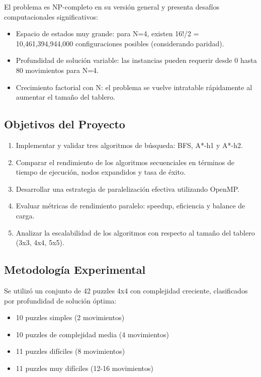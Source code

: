 \documentclass[12pt,a4paper]{article}
\begin{document}
El problema es NP-completo en su versión general y presenta desafíos computacionales significativos:
\begin{itemize}
    \item Espacio de estados muy grande: para N=4, existen 16!/2 = 10,461,394,944,000 configuraciones posibles (considerando paridad).
    \item Profundidad de solución variable: las instancias pueden requerir desde 0 hasta 80 movimientos para N=4.
    \item Crecimiento factorial con N: el problema se vuelve intratable rápidamente al aumentar el tamaño del tablero.
\end{itemize}

\subsection{Objetivos del Proyecto}

\begin{enumerate}
    \item Implementar y validar tres algoritmos de búsqueda: BFS, A*-h1 y A*-h2.
    \item Comparar el rendimiento de los algoritmos secuenciales en términos de tiempo de ejecución, nodos expandidos y tasa de éxito.
    \item Desarrollar una estrategia de paralelización efectiva utilizando OpenMP.
    \item Evaluar métricas de rendimiento paralelo: speedup, eficiencia y balance de carga.
    \item Analizar la escalabilidad de los algoritmos con respecto al tamaño del tablero (3x3, 4x4, 5x5).
\end{enumerate}

\subsection{Metodología Experimental}

Se utilizó un conjunto de 42 puzzles 4x4 con complejidad creciente, clasificados por profundidad de solución óptima:
\begin{itemize}
    \item 10 puzzles simples (2 movimientos)
    \item 10 puzzles de complejidad media (4 movimientos)
    \item 11 puzzles difíciles (8 movimientos)
    \item 11 puzzles muy difíciles (12-16 movimientos)
\end{itemize}
\end{document}
